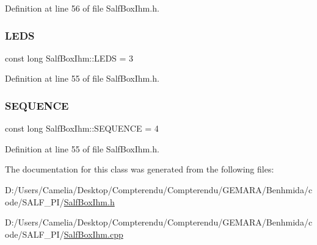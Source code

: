 Definition at line 56 of file Salf\+Box\+Ihm.\+h.

\mbox{\label{class_salf_box_ihm_a7e0bc33d7cce75be082ca75bac2f28da}} 
\subsubsection{\texorpdfstring{L\+E\+DS}{LEDS}}
{\footnotesize\ttfamily const long Salf\+Box\+Ihm\+::\+L\+E\+DS = 3\hspace{0.3cm}{\ttfamily [static]}}



Definition at line 55 of file Salf\+Box\+Ihm.\+h.

\mbox{\label{class_salf_box_ihm_a0e994adbb9f92e763100e01f5faa3747}} 
\subsubsection{\texorpdfstring{S\+E\+Q\+U\+E\+N\+CE}{SEQUENCE}}
{\footnotesize\ttfamily const long Salf\+Box\+Ihm\+::\+S\+E\+Q\+U\+E\+N\+CE = 4\hspace{0.3cm}{\ttfamily [static]}}



Definition at line 55 of file Salf\+Box\+Ihm.\+h.



The documentation for this class was generated from the following files\+:\begin{DoxyCompactItemize}
\item 
D\+:/\+Users/\+Camelia/\+Desktop/\+Compterendu/\+Compterendu/\+G\+E\+M\+A\+R\+A/\+Benhmida/code/\+S\+A\+L\+F\+\_\+\+P\+I/\hyperlink{_salf_box_ihm_8h}{Salf\+Box\+Ihm.\+h}\item 
D\+:/\+Users/\+Camelia/\+Desktop/\+Compterendu/\+Compterendu/\+G\+E\+M\+A\+R\+A/\+Benhmida/code/\+S\+A\+L\+F\+\_\+\+P\+I/\hyperlink{_salf_box_ihm_8cpp}{Salf\+Box\+Ihm.\+cpp}\end{DoxyCompactItemize}
